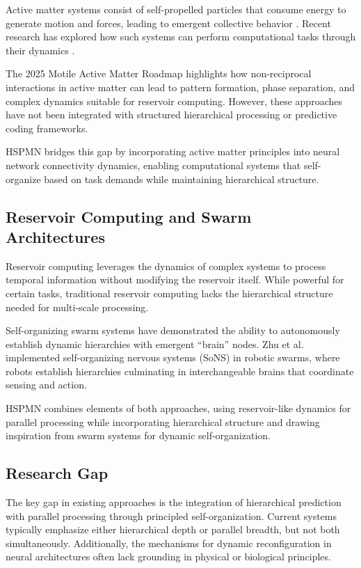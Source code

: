 \documentclass[11pt,a4paper,twocolumn]{article}
\begin{document}
Active matter systems consist of self-propelled particles that consume energy to generate motion and forces, leading to emergent collective behavior \cite{marchetti2024active}. Recent research has explored how such systems can perform computational tasks through their dynamics \cite{cichos2025roadmap, zhao2024nonreciprocal}.

The 2025 Motile Active Matter Roadmap \cite{cichos2025roadmap} highlights how non-reciprocal interactions in active matter can lead to pattern formation, phase separation, and complex dynamics suitable for reservoir computing. However, these approaches have not been integrated with structured hierarchical processing or predictive coding frameworks.

HSPMN bridges this gap by incorporating active matter principles into neural network connectivity dynamics, enabling computational systems that self-organize based on task demands while maintaining hierarchical structure.

\subsection{Reservoir Computing and Swarm Architectures}

Reservoir computing \cite{lukosevicius2009reservoir, sussillo2009generating} leverages the dynamics of complex systems to process temporal information without modifying the reservoir itself. While powerful for certain tasks, traditional reservoir computing lacks the hierarchical structure needed for multi-scale processing.

Self-organizing swarm systems \cite{garnier2007biological} have demonstrated the ability to autonomously establish dynamic hierarchies with emergent ``brain'' nodes. Zhu et al. \cite{zhu2024selforganizing} implemented self-organizing nervous systems (SoNS) in robotic swarms, where robots establish hierarchies culminating in interchangeable brains that coordinate sensing and action.

HSPMN combines elements of both approaches, using reservoir-like dynamics for parallel processing while incorporating hierarchical structure and drawing inspiration from swarm systems for dynamic self-organization.

\subsection{Research Gap}

The key gap in existing approaches is the integration of hierarchical prediction with parallel processing through principled self-organization. Current systems typically emphasize either hierarchical depth or parallel breadth, but not both simultaneously. Additionally, the mechanisms for dynamic reconfiguration in neural architectures often lack grounding in physical or biological principles.
\end{document}
